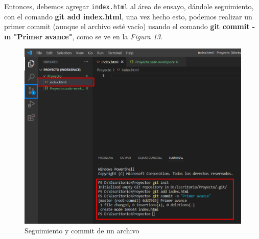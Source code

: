 Entonces, debemos agregar \texttt{index.html} al área de ensayo, dándole seguimiento, con el comando \textbf{git add index.html}, una vez hecho esto, podemos realizar un primer commit (aunque el archivo esté vacío) usando el comando \textbf{git commit -m "Primer avance"}, como se ve en la \textit{Figura 13}.
\begin{figure}[H]
    \begin{center}
        \caption{Seguimiento y commit de un archivo}
        \label{fig: 13}
        \includegraphics[width=12cm]{capturas/git add git commit.png}
    \end{center}
\end{figure}


